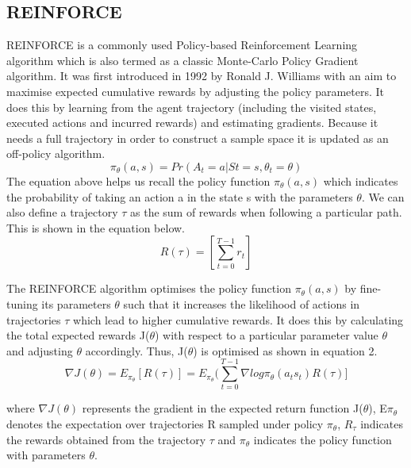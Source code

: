 \documentclass{article}
\begin{document}
\subsection{REINFORCE}
\par REINFORCE is a commonly used Policy-based Reinforcement Learning algorithm which is also termed as a classic Monte-Carlo Policy Gradient algorithm. It was first introduced in 1992 by Ronald J. Williams with an aim to maximise expected cumulative rewards by adjusting the policy parameters. It does this by learning from the agent trajectory (including the visited states, executed actions and incurred rewards) and estimating gradients. Because it needs a full trajectory in order to construct a sample space it is updated as an off-policy algorithm. 
\begin{equation}
\pi_\theta(a, s) = Pr(A_t = a | St = s, \theta_t = \theta)
\end{equation}
The equation above helps us recall the policy function $\pi_{\theta}(a, s)$ which indicates the probability of taking an action a in the state s with the parameters $\theta$.
We can also define a trajectory $\tau$ as the sum of rewards when following a particular path. This is shown in the equation below.
\begin{equation}
R(\tau) = [\sum_{t=0}^{T-1}r_t] 
\end{equation}

\par The REINFORCE algorithm optimises the policy function $\pi_{\theta}(a,s)$ by fine-tuning its parameters $\theta$ such that it increases the likelihood of actions in trajectories $\tau$ which lead to higher cumulative rewards. It does this by calculating the total expected rewards J($\theta$) with respect to a particular parameter value $\theta$ and adjusting $\theta$ accordingly. Thus, J($\theta$) is optimised as shown in equation 2.
\begin{equation}
\nabla J(\theta) = E_{\pi_\theta}[ R(\tau)] =   E_{\pi_\theta} (\sum_{t=0}^{T-1} \nabla log\pi_\theta(a_t s_t) R(\tau)]
\end{equation}

where $\nabla J(\theta)$ represents the gradient in the expected return function J($\theta$), E$\pi_\theta$ denotes the expectation over trajectories R sampled under policy $\pi_\theta$, $R_{\tau}$ indicates the rewards obtained from the trajectory $\tau$ and $\pi_\theta$ indicates the policy function with parameters $\theta$.  \newline
\end{document}
